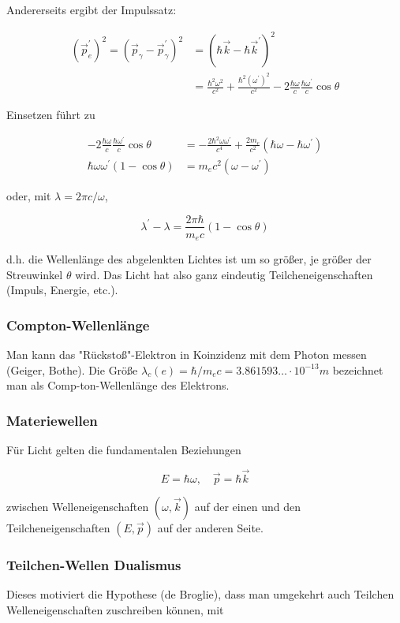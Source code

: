 \documentclass[10pt, letterpaper]{article}
\begin{document}
Andererseits ergibt der Impulssatz:

$$
\begin{aligned}
\left(\vec{p}_{e}^{\prime}\right)^{2}=\left(\vec{p}_{\gamma}-\vec{p}_{\gamma}^{\prime}\right)^{2} & =\left(\hbar \vec{k}-\hbar \vec{k}^{\prime}\right)^{2} \\
& =\frac{\hbar^{2} \omega^{2}}{c^{2}}+\frac{\hbar^{2}\left(\omega^{\prime}\right)^{2}}{c^{2}}-2 \frac{\hbar \omega}{c} \frac{\hbar \omega^{\prime}}{c} \cos \theta
\end{aligned}
$$

Einsetzen führt zu

$$
\begin{aligned}
-2 \frac{\hbar \omega}{c} \frac{\hbar \omega^{\prime}}{c} \cos \theta & =-\frac{2 \hbar^{2} \omega \omega^{\prime}}{c^{4}}+\frac{2 m_{e}}{c^{2}}\left(\hbar \omega-\hbar \omega^{\prime}\right) \\
\hbar \omega \omega^{\prime}(1-\cos \theta) & =m_{e} c^{2}\left(\omega-\omega^{\prime}\right)
\end{aligned}
$$

oder, mit $\lambda=2 \pi c / \omega$,

$$
\lambda^{\prime}-\lambda=\frac{2 \pi \hbar}{m_{e} c}(1-\cos \theta)
$$

d.h. die Wellenlänge des abgelenkten Lichtes ist um so größer, je größer der Streuwinkel $\theta$ wird. Das Licht hat also ganz eindeutig Teilcheneigenschaften (Impuls, Energie, etc.).

\subsubsection*{Compton-Wellenlänge}
Man kann das "Rückstoß"-Elektron in Koinzidenz mit dem Photon messen (Geiger, Bothe). Die Größe $\lambda_{c}(e)=\hbar / m_{e} c=3.861593 \ldots \cdot 10^{-13} m$ bezeichnet man als Comp-ton-Wellenlänge des Elektrons.

\subsubsection*{Materiewellen}
Für Licht gelten die fundamentalen Beziehungen

$$
E=\hbar \omega, \quad \vec{p}=\hbar \vec{k}
$$

zwischen Welleneigenschaften $(\omega, \vec{k})$ auf der einen und den Teilcheneigenschaften $(E, \vec{p})$ auf der anderen Seite.

\subsubsection*{Teilchen-Wellen Dualismus}
Dieses motiviert die Hypothese (de Broglie), dass man umgekehrt auch Teilchen Welleneigenschaften zuschreiben können, mit
\end{document}
